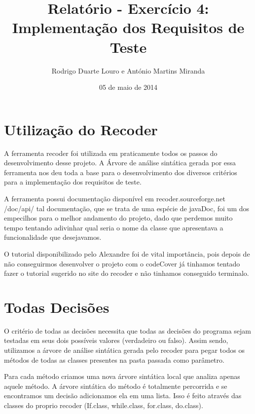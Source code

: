 \documentclass[12pt]{article} %
\begin{document}
\title{Relatório - Exercício 4: Implementação dos Requisitos de Teste} %
\author{Rodrigo Duarte Louro e António Martins Miranda} %
\date{05 de maio de 2014} %

\maketitle %

\newpage

\section{Utilização do Recoder}
\mbox{} %

	A ferramenta recoder foi utilizada em praticamente todos os passos do desenvolvimento desse projeto. 
A Árvore de análise sintática gerada por essa ferramenta nos deu toda a base para o desenvolvimento dos 
diversos critérios para a implementação dos requisitos de teste. 

	A ferramenta possui documentação disponível em recoder.sourceforge.net /doc/api/  tal documentação, que se trata de uma espécie de 
javaDoc, foi um dos empecilhos para o melhor andamento do projeto, dado que perdemos muito tempo tentando adivinhar qual seria o nome da classe que apresentava a funcionalidade que desejavamos. 
	
	O tutorial disponibilizado pelo Alexandre foi de vital importância, pois depois de não conseguirmos desenvolver o projeto 
com o codeCover já tinhamos tentado fazer o tutorial sugerido no site do recoder e não tinhamos conseguido terminalo. 

\section{Todas Decisões}
\mbox{}
	O critério de todas as decisões necessita que todas as decisões do programa sejam testadas em seus dois possíveis valores
(verdadeiro ou falso). Assim sendo, utilizamos a árvore de análise sintática gerada pelo recoder para pegar todos os métodos 
de todas as classes presentes na pasta passada como parâmetro. 
	
	Para cada método criamos uma nova árvore sintática local que analiza apenas aquele método.  A árvore sintática do método
é totalmente percorrida e se encontramos um decisão adicionamos ela em uma lista. Isso é feito através das classes do proprio recoder
(If.class, while.class, for.class, do.class). 
	
\end{document}
